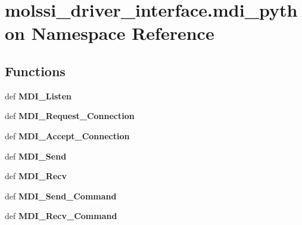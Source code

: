 \hypertarget{namespacemolssi__driver__interface_1_1mdi__python}{\section{molssi\-\_\-driver\-\_\-interface.\-mdi\-\_\-python Namespace Reference}
\label{namespacemolssi__driver__interface_1_1mdi__python}
}
\subsection*{Functions}
\begin{DoxyCompactItemize}
\item 
\hypertarget{namespacemolssi__driver__interface_1_1mdi__python_a473300f27d010a3ada7217ec48249987}{def {\bfseries M\-D\-I\-\_\-\-Listen}}\label{namespacemolssi__driver__interface_1_1mdi__python_a473300f27d010a3ada7217ec48249987}

\item 
\hypertarget{namespacemolssi__driver__interface_1_1mdi__python_a462f1d4064bd452f0451d0bd416d477d}{def {\bfseries M\-D\-I\-\_\-\-Request\-\_\-\-Connection}}\label{namespacemolssi__driver__interface_1_1mdi__python_a462f1d4064bd452f0451d0bd416d477d}

\item 
\hypertarget{namespacemolssi__driver__interface_1_1mdi__python_ad6bd04c3468d1746422da9b8367994e0}{def {\bfseries M\-D\-I\-\_\-\-Accept\-\_\-\-Connection}}\label{namespacemolssi__driver__interface_1_1mdi__python_ad6bd04c3468d1746422da9b8367994e0}

\item 
\hypertarget{namespacemolssi__driver__interface_1_1mdi__python_afb9201d2f2c1533d7c23e8ebb5e00ce4}{def {\bfseries M\-D\-I\-\_\-\-Send}}\label{namespacemolssi__driver__interface_1_1mdi__python_afb9201d2f2c1533d7c23e8ebb5e00ce4}

\item 
\hypertarget{namespacemolssi__driver__interface_1_1mdi__python_a6bb1889ef0841ac60a5c70dc575163af}{def {\bfseries M\-D\-I\-\_\-\-Recv}}\label{namespacemolssi__driver__interface_1_1mdi__python_a6bb1889ef0841ac60a5c70dc575163af}

\item 
\hypertarget{namespacemolssi__driver__interface_1_1mdi__python_a3b276ef8d6df15bd9f9247bb4533d892}{def {\bfseries M\-D\-I\-\_\-\-Send\-\_\-\-Command}}\label{namespacemolssi__driver__interface_1_1mdi__python_a3b276ef8d6df15bd9f9247bb4533d892}

\item 
\hypertarget{namespacemolssi__driver__interface_1_1mdi__python_aaa1d9f12085c3947c2f5fae016fb2094}{def {\bfseries M\-D\-I\-\_\-\-Recv\-\_\-\-Command}}\label{namespacemolssi__driver__interface_1_1mdi__python_aaa1d9f12085c3947c2f5fae016fb2094}

\end{DoxyCompactItemize}
